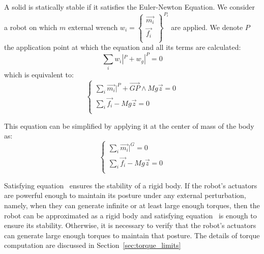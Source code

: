 A solid is statically stable if it satisfies the Euler-Newton Equation.
We consider a robot on which $m$ external wrench $w_i = \left\{ \begin{array}{r}
    \vec{m_i}\\
    \vec{f_i}\\
\end{array} \right\}^{P_i}$ are applied.
We denote $P$ the application point at which the equation and all its terms are calculated:
\begin{equation}
  \sum\limits_i w_i|^P + w_g|^P = 0
\end{equation}
which is equivalent to:
\begin{equation}
\left\{
\begin{array}{r}
  \sum\limits_i \vec{m_i}|^P + \overrightarrow{GP}\wedge Mg\vec{z} = 0 \\
  \sum\limits_i \vec{f_i} - Mg\vec{z} = 0 \\
\end{array}
\right.
\end{equation}

This equation can be simplified by applying it at the center of mass of the body as:
\begin{equation}
  \left\{
  \begin{array}{r}
    \sum\limits_i \vec{m_i}|^G = 0 \\
    \sum\limits_i \vec{f_i} - Mg\vec{z} = 0 \\
  \end{array}
  \right.
\label{eq:stability}
\end{equation}

Satisfying equation~ ensures the stability of a rigid body.
If the robot's actuators are powerful enough to maintain its posture under any external perturbation, namely, when they can generate infinite or at least large enough torques, then the robot can be approximated as a rigid body and satisfying equation~ is enough to ensure its stability.
Otherwise, it is necessary to verify that the robot's actuators can generate large enough torques to maintain that posture.
The details of torque computation are discussed in Section~\ref{sec:torque_limits}


